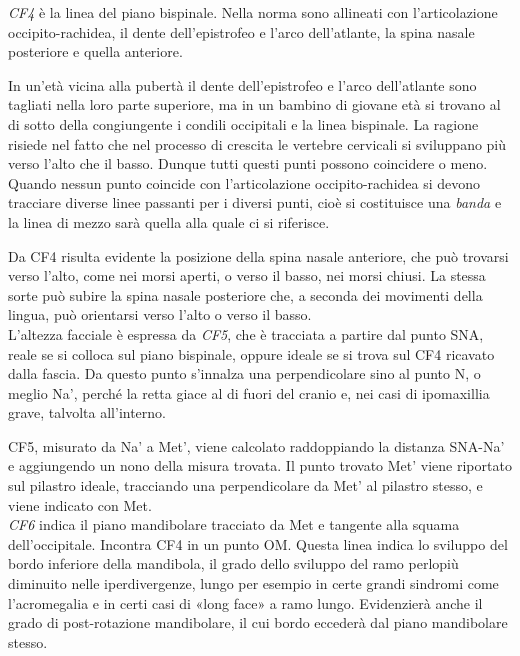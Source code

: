 \emph{CF4} è la linea del piano bispinale. Nella norma sono allineati con l'articolazione occipito-rachidea, il dente dell'epistrofeo e l'arco dell'atlante, la spina nasale posteriore e quella anteriore.

In un'età vicina alla pubertà il dente dell'epistrofeo e l'arco dell'atlante sono tagliati nella loro parte superiore, ma in un bambino di giovane età si trovano al di sotto della congiungente i condili occipitali e la linea bispinale. La ragione risiede nel fatto che nel processo di crescita le vertebre cervicali si sviluppano più verso l'alto che il basso. Dunque tutti questi punti possono coincidere o meno. Quando nessun punto coincide con l'articolazione occipito-rachidea si devono tracciare diverse linee passanti per i diversi punti, cioè si costituisce una \emph{banda} e la linea di mezzo sarà quella alla quale ci si riferisce.

Da CF4 risulta evidente la posizione della spina nasale anteriore, che può trovarsi verso l'alto, come nei morsi aperti, o verso il basso, nei morsi chiusi. La stessa sorte può subire la spina nasale posteriore che, a seconda dei movimenti della lingua, può orientarsi verso l'alto o verso il basso.\\

L'altezza facciale è espressa da \emph{CF5}, che è tracciata a partire dal punto SNA, reale se si colloca sul piano bispinale, oppure ideale se si trova sul CF4 ricavato dalla fascia. Da questo punto s'innalza una perpendicolare sino al punto N, o meglio Na', perché la retta giace al di fuori del cranio e, nei casi di ipomaxillia grave, talvolta all'interno.

CF5, misurato da Na' a Met', viene calcolato raddoppiando la distanza SNA-Na' e aggiungendo un nono della misura trovata. Il punto trovato Met' viene riportato sul pilastro ideale, tracciando una perpendicolare da Met' al pilastro stesso, e viene indicato con Met.\\

\emph{CF6} indica il piano mandibolare tracciato da Met e tangente alla squama dell'occipitale. Incontra CF4 in un punto OM. Questa linea indica lo sviluppo del bordo inferiore della mandibola, il grado dello sviluppo del ramo perlopiù diminuito nelle iperdivergenze, lungo per esempio in certe grandi sindromi come l'acromegalia e in certi casi di «long face» a ramo lungo. Evidenzierà anche il grado di post-rotazione mandibolare, il cui bordo eccederà dal piano mandibolare stesso.\\

